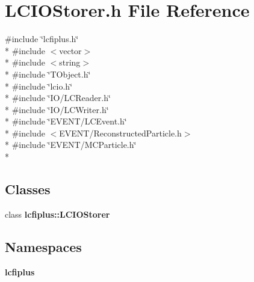 \section{L\-C\-I\-O\-Storer.\-h File Reference}
\label{LCIOStorer_8h}
{\ttfamily \#include \char`\"{}lcfiplus.\-h\char`\"{}}\\*
{\ttfamily \#include $<$vector$>$}\\*
{\ttfamily \#include $<$string$>$}\\*
{\ttfamily \#include \char`\"{}T\-Object.\-h\char`\"{}}\\*
{\ttfamily \#include \char`\"{}lcio.\-h\char`\"{}}\\*
{\ttfamily \#include \char`\"{}I\-O/\-L\-C\-Reader.\-h\char`\"{}}\\*
{\ttfamily \#include \char`\"{}I\-O/\-L\-C\-Writer.\-h\char`\"{}}\\*
{\ttfamily \#include \char`\"{}E\-V\-E\-N\-T/\-L\-C\-Event.\-h\char`\"{}}\\*
{\ttfamily \#include $<$E\-V\-E\-N\-T/\-Reconstructed\-Particle.\-h$>$}\\*
{\ttfamily \#include \char`\"{}E\-V\-E\-N\-T/\-M\-C\-Particle.\-h\char`\"{}}\\*
\subsection*{Classes}
\begin{DoxyCompactItemize}
\item 
class {\bf lcfiplus\-::\-L\-C\-I\-O\-Storer}
\end{DoxyCompactItemize}
\subsection*{Namespaces}
\begin{DoxyCompactItemize}
\item 
{\bf lcfiplus}
\end{DoxyCompactItemize}
